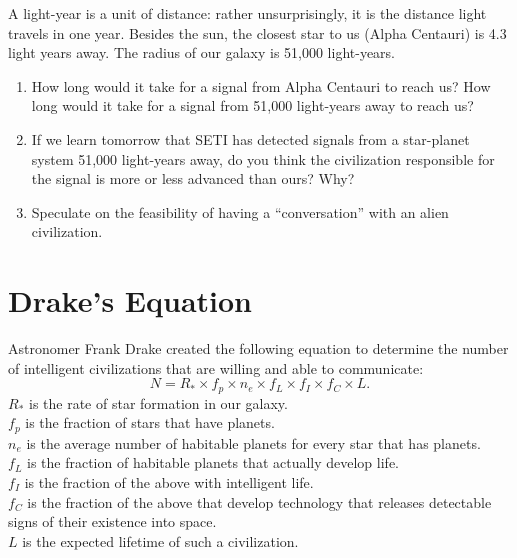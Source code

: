 \documentclass[12pt]{article}%
\begin{document}
A light-year is a unit of distance: rather unsurprisingly, it is the distance light travels in one year.  
Besides the sun, the closest star to us (Alpha Centauri) is 4.3 light years away.  
The radius of our galaxy is 51,000 light-years.  

\begin{enumerate}

\item How long would it take for a signal from Alpha Centauri to reach us?  
How long would it take for a signal from 51,000 light-years away to reach us?  %

\item  If we learn tomorrow that SETI has detected signals from a star-planet system 51,000 light-years away, do you think the civilization responsible for the signal is more or less advanced than ours?  Why? %

\item Speculate on the feasibility of having a ``conversation'' with an alien civilization. 

\end{enumerate}


\section{Drake's Equation}

Astronomer Frank Drake created the following equation to determine the number of intelligent civilizations that are willing and able to communicate:
$$ N = R_{*} \times f_{p} \times n_{e} \times f_{L} \times f_{I} \times f_{C} \times L. $$
$R_{*}$ is the rate of star formation in our galaxy.
\\
$f_{p}$ is the fraction of stars that have planets.
\\
$n_{e}$ is the average number of habitable planets for every star that has planets.
\\
$f_{L}$ is the fraction of habitable planets that actually develop life.
\\
$f_{I}$ is the fraction of the above with intelligent life.
\\
$f_{C}$ is the fraction of the above that develop technology that releases detectable signs of their existence into space.
\\
$L$ is the expected lifetime of such a civilization.
\end{document}
